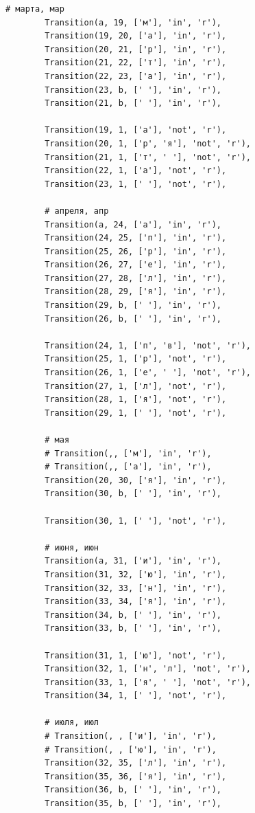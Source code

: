 \documentclass[a4paper, 14pt]{article}
\begin{document}
\begin{lstlisting}[label=some-code,caption=Автомат для поиска даты в текстовом формате]
        # марта, мар
        Transition(a, 19, ['м'], 'in', 'r'),
        Transition(19, 20, ['а'], 'in', 'r'),
        Transition(20, 21, ['р'], 'in', 'r'),
        Transition(21, 22, ['т'], 'in', 'r'),
        Transition(22, 23, ['а'], 'in', 'r'),
        Transition(23, b, [' '], 'in', 'r'),
        Transition(21, b, [' '], 'in', 'r'),

        Transition(19, 1, ['а'], 'not', 'r'),
        Transition(20, 1, ['р', 'я'], 'not', 'r'),
        Transition(21, 1, ['т', ' '], 'not', 'r'),
        Transition(22, 1, ['а'], 'not', 'r'),
        Transition(23, 1, [' '], 'not', 'r'),

        # апреля, апр
        Transition(a, 24, ['а'], 'in', 'r'),
        Transition(24, 25, ['п'], 'in', 'r'),
        Transition(25, 26, ['р'], 'in', 'r'),
        Transition(26, 27, ['е'], 'in', 'r'),
        Transition(27, 28, ['л'], 'in', 'r'),
        Transition(28, 29, ['я'], 'in', 'r'),
        Transition(29, b, [' '], 'in', 'r'),
        Transition(26, b, [' '], 'in', 'r'),

        Transition(24, 1, ['п', 'в'], 'not', 'r'),
        Transition(25, 1, ['р'], 'not', 'r'),
        Transition(26, 1, ['е', ' '], 'not', 'r'),
        Transition(27, 1, ['л'], 'not', 'r'),
        Transition(28, 1, ['я'], 'not', 'r'),
        Transition(29, 1, [' '], 'not', 'r'),

        # мая
        # Transition(,, ['м'], 'in', 'r'),
        # Transition(,, ['а'], 'in', 'r'),
        Transition(20, 30, ['я'], 'in', 'r'),
        Transition(30, b, [' '], 'in', 'r'),

        Transition(30, 1, [' '], 'not', 'r'),

        # июня, июн
        Transition(a, 31, ['и'], 'in', 'r'),
        Transition(31, 32, ['ю'], 'in', 'r'),
        Transition(32, 33, ['н'], 'in', 'r'),
        Transition(33, 34, ['я'], 'in', 'r'),
        Transition(34, b, [' '], 'in', 'r'),
        Transition(33, b, [' '], 'in', 'r'),

        Transition(31, 1, ['ю'], 'not', 'r'),
        Transition(32, 1, ['н', 'л'], 'not', 'r'),
        Transition(33, 1, ['я', ' '], 'not', 'r'),
        Transition(34, 1, [' '], 'not', 'r'),

        # июля, июл
        # Transition(, , ['и'], 'in', 'r'),
        # Transition(, , ['ю'], 'in', 'r'),
        Transition(32, 35, ['л'], 'in', 'r'),
        Transition(35, 36, ['я'], 'in', 'r'),
        Transition(36, b, [' '], 'in', 'r'),
        Transition(35, b, [' '], 'in', 'r'),


\end{lstlisting}
\end{document}

